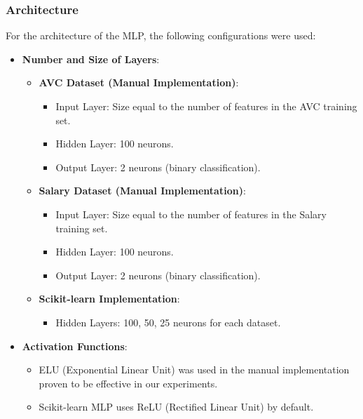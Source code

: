 \documentclass[a4paper,12pt]{article}
\begin{document}
\subsubsection{Architecture}
For the architecture of the MLP, the following configurations were used:
\begin{itemize}
    \item \textbf{Number and Size of Layers}:
    \begin{itemize}
        \item \textbf{AVC Dataset (Manual Implementation)}: 
        \begin{itemize}
            \item Input Layer: Size equal to the number of features in the AVC training set.
            \item Hidden Layer: 100 neurons.
            \item Output Layer: 2 neurons (binary classification).
        \end{itemize}
        \item \textbf{Salary Dataset (Manual Implementation)}: 
        \begin{itemize}
            \item Input Layer: Size equal to the number of features in the Salary training set.
            \item Hidden Layer: 100 neurons.
            \item Output Layer: 2 neurons (binary classification).
        \end{itemize}
        \newpage
        \item \textbf{Scikit-learn Implementation}: 
        \begin{itemize}
            \item Hidden Layers: 100, 50, 25 neurons for each dataset.
        \end{itemize}
    \end{itemize}
    \item \textbf{Activation Functions}:
    \begin{itemize}
        \item ELU (Exponential Linear Unit) was used in the manual implementation proven to be effective in our experiments.
        \item Scikit-learn MLP uses ReLU (Rectified Linear Unit) by default.
    \end{itemize}
\end{itemize}
\end{document}
